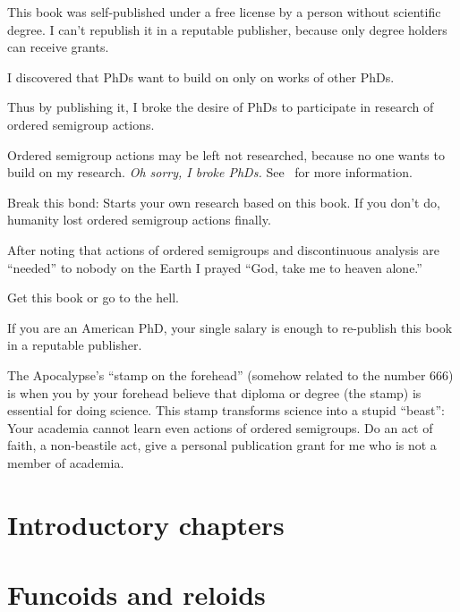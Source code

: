 \documentclass[a4paper,oneside,english,reqno]{amsbook}
\numberwithin{section}{chapter}
\let\noindent\empty %
\begin{document}
{
  \huge
This book was self-published under a free license by a person without scientific degree.
I can't republish it in a reputable publisher, because only degree holders can receive grants.

I discovered that PhDs want to build on only on works of other PhDs.

Thus by publishing it, I broke the desire of PhDs to participate in research of ordered semigroup actions.

Ordered semigroup actions may be left not researched, because no one wants to build on my research.
\emph{Oh sorry, I broke PhDs.} See~\cite{broke-science} for more information.

Break this bond: Starts your own research based on this book. If you don't do, humanity lost ordered semigroup actions finally.

\noindent\makebox[\linewidth]{\rule{\paperwidth}{0.4pt}}

After noting that actions of ordered semigroups and discontinuous analysis are ``needed''
to nobody on the Earth I prayed ``God, take me to heaven alone.''

Get this book or go to the hell.

If you are an American PhD, your single salary is enough to re-publish this book in
a reputable publisher.

The Apocalypse's ``stamp on the forehead'' (somehow related to the number 666) is when
you by your forehead believe that diploma or degree (the stamp) is essential for doing science.
This stamp transforms science into a stupid ``beast'': Your academia cannot learn even
actions of ordered semigroups. Do an act of faith, a non-beastile act, give a personal publication
grant for me who is not a member of academia.
}

\tableofcontents{}

\part{Introductory chapters}







\part{Funcoids and reloids}













\end{document}
